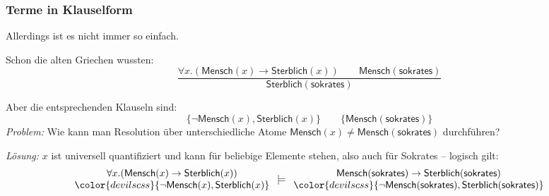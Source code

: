 \documentclass[aspectratio=1610,onlymath]{beamer}
\begin{document}
\begin{frame}\frametitle{Terme in Klauselform}

Allerdings ist es nicht immer so einfach.\medskip

Schon die alten Griechen wussten:
% 
\[ \frac{
\forall x.(\textsf{Mensch}(x)\to\textsf{Sterblich}(x))\qquad \textsf{Mensch}(\textsf{sokrates})}
{\textsf{Sterblich}(\textsf{sokrates})}
\]

\pause Aber die entsprechenden Klauseln sind:
% 
\[  \{\neg\textsf{Mensch}(x),\textsf{Sterblich}(x)\}\qquad \{\textsf{Mensch}(\textsf{sokrates})\} \]
% 
\emph{Problem:} Wie kann man Resolution über unterschiedliche Atome $\textsf{Mensch}(x)\neq \textsf{Mensch}(\textsf{sokrates})$ durchführen?
\bigskip\pause

\emph{Lösung:} $x$ ist universell quantifiziert und kann für beliebige Elemente stehen, also auch für Sokrates -- logisch gilt:
%
\footnotesize
\[\begin{array}{c}
\forall x.(\textsf{Mensch}(x)\to\textsf{Sterblich}(x))\\
{\color{devilscss}\{\neg\textsf{Mensch}(x),\textsf{Sterblich}(x)\}}
\end{array}
\models
\begin{array}{c}
\textsf{Mensch}(\textsf{sokrates})\to\textsf{Sterblich}(\textsf{sokrates})\\
{\color{devilscss}\{\neg\textsf{Mensch}(\textsf{sokrates}),\textsf{Sterblich}(\textsf{sokrates})\}}
\end{array}
\]

\end{frame}
\end{document}
